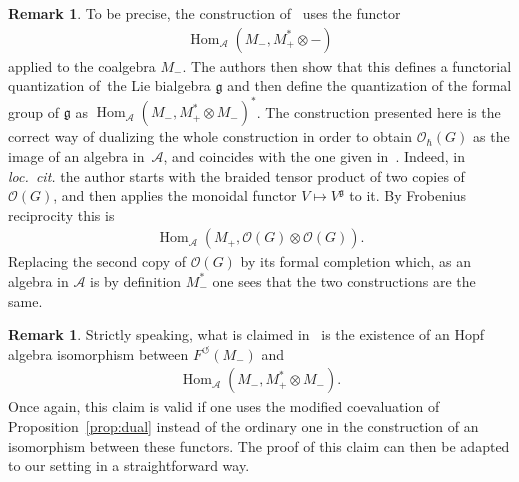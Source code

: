 \documentclass[pdftex]{sigma}
\numberwithin{equation}{section}
\newcommand{\ca}{\circlearrowleft}
\newcommand{\mf}[1]{\mathfrak{#1}}
\newcommand{\h}{\hslash}
\newcommand{\ot}{\otimes}
\newcommand{\cO}{\mathcal O}
\newcommand{\cA}{\mathcal {A}}
\renewcommand{\hom}{\operatorname{Hom}}
\theoremstyle{definition}
\newtheorem{rmk}[thm]{Remark}
\begin{document}
\begin{rmk}\label{rmk:EK}
	To be precise, the construction of~\cite{Etingof1996} uses the functor
\begin{gather*}
		\hom_\cA(M_-,M_+^*\ot -)
	\end{gather*} applied to the coalgebra $M_-$. The authors then show that this def\/ines a functorial quantization of~the Lie bialgebra $\mf g$ and then def\/ine the quantization of the formal group of $\mf g$ as $\hom_\cA(M_-,M_+^*\ot M_-)^*$. The construction presented here is the correct way of dualizing the whole construction in order to obtain $\cO_\h(G)$ as the image of an algebra in~$\cA$, and coincides with the one given in~\cite{Severa2016}. Indeed, in \emph{loc.\ cit.} the author starts with the braided tensor product of two copies of~$\cO(G)$, and then applies the monoidal functor $V\mapsto V^{\mf g}$ to it. By Frobenius reciprocity this is
	\begin{gather*}
		\hom_\cA(M_+,\cO(G)\ot \cO(G)).
	\end{gather*}
	Replacing the second copy of $\cO(G)$ by its formal completion which, as an algebra in $\cA$ is by def\/inition $M_-^*$ one sees that the two constructions are the same.
\end{rmk}
\begin{rmk}
	Strictly speaking, what is claimed in~\cite{Etingof1996} is the existence of an Hopf algebra isomorphism between $F^\ca(M_-)$ and
	\begin{gather*}
		\hom_\cA(M_-,M_+^*\ot M_-).
	\end{gather*}
	Once again, this claim is valid if one uses the modif\/ied coevaluation of Proposition~\ref{prop:dual} instead of the ordinary one in the construction of an isomorphism between these functors. The proof of this claim can then be adapted to our setting in a straightforward way.
\end{rmk}
\end{document}
